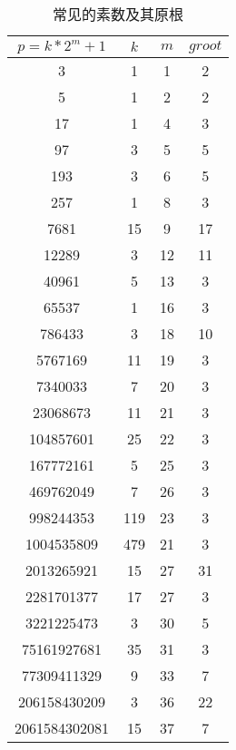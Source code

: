 \begin{table}[!htbp]
\centering
\caption{常见的素数及其原根 \label{tab:ntt-primes}}
\begin{tabular}{|c|c|c|c|}
\hline
$p=k*2^m + 1$         & $k$   & $m$  & $groot$ \\ \hline
3                   & 1   & 1  & 2     \\ \hline
5                   & 1   & 2  & 2     \\ \hline
17                  & 1   & 4  & 3     \\ \hline
97                  & 3   & 5  & 5     \\ \hline
193                 & 3   & 6  & 5     \\ \hline
257                 & 1   & 8  & 3     \\ \hline
7681                & 15  & 9  & 17    \\ \hline
12289               & 3   & 12 & 11    \\ \hline
40961               & 5   & 13 & 3     \\ \hline
65537               & 1   & 16 & 3     \\ \hline
786433              & 3   & 18 & 10    \\ \hline
5767169             & 11  & 19 & 3     \\ \hline
7340033             & 7   & 20 & 3     \\ \hline
23068673            & 11  & 21 & 3     \\ \hline
104857601           & 25  & 22 & 3     \\ \hline
167772161           & 5   & 25 & 3     \\ \hline
469762049           & 7   & 26 & 3     \\ \hline
{ \color{red}998244353}           & 119 & 23 & 3     \\ \hline
{\color{red}1004535809}          & 479 & 21 & 3     \\ \hline
2013265921          & 15  & 27 & 31    \\ \hline
{\color{red}2281701377}          & 17  & 27 & 3     \\ \hline
3221225473          & 3   & 30 & 5     \\ \hline
75161927681         & 35  & 31 & 3     \\ \hline
77309411329         & 9   & 33 & 7     \\ \hline
206158430209        & 3   & 36 & 22    \\ \hline
2061584302081       & 15  & 37 & 7     \\ \hline

\end{tabular}
\end{table}
